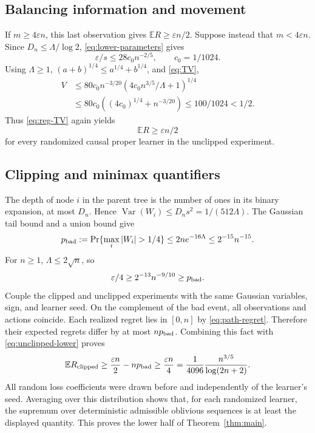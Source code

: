 \documentclass[11pt]{article}
\theoremstyle{definition}
\newcommand{\E}{\mathbb E}
\begin{document}
\subsection{Balancing information and movement}

If $m\geq4\varepsilon n$, this last observation gives $\E R\geq\varepsilon n/2$. Suppose instead that $m<4\varepsilon n$. Since $D_n\leq\Lambda/\log2$, \eqref{eq:lower-parameters} gives
\[
 \varepsilon/s\leq28c_0 n^{-2/5},\qquad c_0=1/1024.
\]
Using $\Lambda\geq1$, $(a+b)^{1/4}\leq a^{1/4}+b^{1/4}$, and \eqref{eq:TV},
\begin{align*}
 V&\leq80c_0n^{-3/20}
       \left(4c_0n^{3/5}/\Lambda+1\right)^{1/4}\\
  &\leq80c_0\left((4c_0)^{1/4}+n^{-3/20}\right)
   \leq100/1024<1/2.
\end{align*}
Thus \eqref{eq:reg-TV} again yields
\begin{equation}\label{eq:unclipped-lower}
 \E R\geq\varepsilon n/2
\end{equation}
for every randomized causal proper learner in the unclipped experiment.

\subsection{Clipping and minimax quantifiers}

The depth of node $i$ in the parent tree is the number of ones in its binary expansion, at most $D_n$. Hence $\operatorname{Var}(W_i)\leq D_ns^2=1/(512\Lambda)$. The Gaussian tail bound and a union bound give
\[
 p_{\rm bad}:=\Pr\{\max_i|W_i|>1/4\}
 \leq2n e^{-16\Lambda}
 \leq2^{-15}n^{-15}.
\]
For $n\geq1$, $\Lambda\leq2\sqrt n$, so
\[
 \varepsilon/4\geq2^{-13}n^{-9/10}\geq p_{\rm bad}.
\]
Couple the clipped and unclipped experiments with the same Gaussian variables, sign, and learner seed. On the complement of the bad event, all observations and actions coincide. Each realized regret lies in $[0,n]$ by \eqref{eq:path-regret}. Therefore their expected regrets differ by at most $np_{\rm bad}$. Combining this fact with \eqref{eq:unclipped-lower} proves
\[
 \E R_{\rm clipped}\geq\frac{\varepsilon n}{2}-np_{\rm bad}
 \geq\frac{\varepsilon n}{4}
 =\frac1{4096}\frac{n^{3/5}}{\log(2n+2)}.
\]
All random loss coefficients were drawn before and independently of the learner's seed. Averaging over this distribution shows that, for each randomized learner, the supremum over deterministic admissible oblivious sequences is at least the displayed quantity. This proves the lower half of Theorem~\ref{thm:main}.
\end{document}
